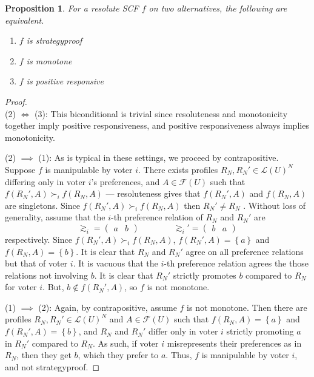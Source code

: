 \documentclass{book}
\theoremstyle{plain}
\newtheorem{proposition}[theorem]{Proposition}
\theoremstyle{definition}
\theoremstyle{remark}
\newcommand{\set}[1]{\left\{#1\right\}}
\begin{document}
\begin{proposition}
    For a resolute SCF $f$ on two alternatives, 
    the following are equivalent.
    \begin{enumerate}
        \item $f$ is strategyproof
        \item $f$ is monotone
        \item $f$ is positive responsive
    \end{enumerate}
\end{proposition}
\begin{proof}
    \leavevmode\\
    (2) $\iff$ (3):
    This biconditional is 
    trivial since 
    resoluteness and monotonicity together imply positive responsiveness, 
    and positive responsiveness always implies monotonicity.

    (2) $\implies$ (1):
    As is typical in these settings, 
    we proceed by contrapositive.
    Suppose $f$ is manipulable by voter $i$.
    There exists profiles 
    $R_N, R_N' \in \mathcal{L}(U)^N$ differing only 
    in 
    voter $i$'s preferences, and $A \in \mathcal{F}(U)$ such that
    $f(R_N', A) \succ_i f(R_N, A)$ --- resoluteness gives that $f(R_N', A)$ and $f(R_N, A)$ are singletons.
    Since $f(R_N', A) \succ_i f(R_N, A)$ then $R_N' \neq R_N$ .
    Without loss of generality, 
    assume that the $i$-th preference relation of 
    $R_N$ and $R_N'$ are 
    \[
        \gtrsim_i = \begin{pmatrix}
            a & b
        \end{pmatrix}
        \qquad\qquad
        \gtrsim_i' = \begin{pmatrix}
            b & a
        \end{pmatrix}
    \]
    respectively.
    Since $f(R_N', A) \succ_i f(R_N, A)$,
    $f(R_N', A) = \set{a}$ and $f(R_N, A) = \set{b}$.
    It is clear that $R_N$ and $R_N'$ agree on 
    all preference relations but that of voter $i$.
    It is vacuous that the $i$-th preference relation
    agrees the those relations not involving 
    $b$. It is clear that 
    $R_N'$ strictly promotes
    $b$ compared to $R_N$ for 
    voter $i$.
    But, $b \notin f(R_N', A)$, so 
    $f$ is not monotone.

    (1) $\implies$ (2):
    Again, by contrapositive, 
    assume $f$ is not monotone.
    Then there are profiles $R_N, R_N' \in \mathcal{L}(U)^N$ and $A \in \mathcal{F}(U)$ such that
    $f(R_N, A) = \set{a}$ and $f(R_N', A) = \set{b}$, and $R_N$ and $R_N'$ differ only in voter $i$
    strictly promoting $a$ in $R_N'$ compared to $R_N$.
    As such, if voter $i$ misrepresents their preferences as in $R_N$, then they get $b$, which they prefer to $a$.
    Thus, $f$ is manipulable by voter $i$, and not strategyproof.
\end{proof}
\end{document}
